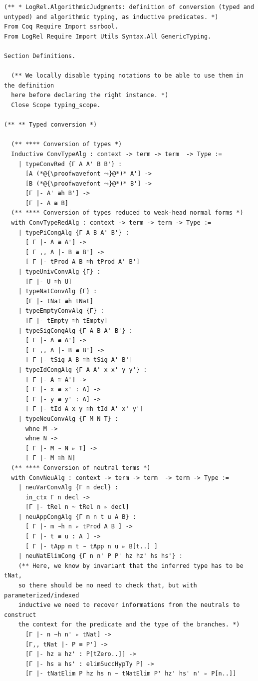 \documentclass[10pt,a4paper]{amsart}
\begin{document}
\begin{lstlisting}
(** * LogRel.AlgorithmicJudgments: definition of conversion (typed and untyped) and algorithmic typing, as inductive predicates. *)
From Coq Require Import ssrbool.
From LogRel Require Import Utils Syntax.All GenericTyping.

Section Definitions.

  (** We locally disable typing notations to be able to use them in the definition
  here before declaring the right instance. *)
  Close Scope typing_scope.

(** ** Typed conversion *)

  (** **** Conversion of types *)
  Inductive ConvTypeAlg : context -> term -> term  -> Type :=
    | typeConvRed {Γ A A' B B'} :
      [A (*@{\proofwavefont ⤳}@*)* A'] ->
      [B (*@{\proofwavefont ⤳}@*)* B'] ->
      [Γ |- A' ≅h B'] ->
      [Γ |- A ≅ B]
  (** **** Conversion of types reduced to weak-head normal forms *)
  with ConvTypeRedAlg : context -> term -> term -> Type :=
    | typePiCongAlg {Γ A B A' B'} :
      [ Γ |- A ≅ A'] ->
      [ Γ ,, A |- B ≅ B'] ->
      [ Γ |- tProd A B ≅h tProd A' B']
    | typeUnivConvAlg {Γ} :
      [Γ |- U ≅h U]
    | typeNatConvAlg {Γ} :
      [Γ |- tNat ≅h tNat]
    | typeEmptyConvAlg {Γ} :
      [Γ |- tEmpty ≅h tEmpty]
    | typeSigCongAlg {Γ A B A' B'} :
      [ Γ |- A ≅ A'] ->
      [ Γ ,, A |- B ≅ B'] ->
      [ Γ |- tSig A B ≅h tSig A' B']
    | typeIdCongAlg {Γ A A' x x' y y'} :
      [ Γ |- A ≅ A'] ->
      [ Γ |- x ≅ x' : A] ->
      [ Γ |- y ≅ y' : A] ->
      [ Γ |- tId A x y ≅h tId A' x' y']
    | typeNeuConvAlg {Γ M N T} :
      whne M ->
      whne N ->
      [ Γ |- M ~ N ▹ T] -> 
      [ Γ |- M ≅h N]
  (** **** Conversion of neutral terms *)
  with ConvNeuAlg : context -> term -> term  -> term -> Type :=
    | neuVarConvAlg {Γ n decl} :
      in_ctx Γ n decl ->
      [Γ |- tRel n ~ tRel n ▹ decl]
    | neuAppCongAlg {Γ m n t u A B} :
      [ Γ |- m ~h n ▹ tProd A B ] ->
      [ Γ |- t ≅ u : A ] ->
      [ Γ |- tApp m t ~ tApp n u ▹ B[t..] ]
    | neuNatElimCong {Γ n n' P P' hz hz' hs hs'} :
    (** Here, we know by invariant that the inferred type has to be tNat,
    so there should be no need to check that, but with parameterized/indexed
    inductive we need to recover informations from the neutrals to construct
    the context for the predicate and the type of the branches. *)
      [Γ |- n ~h n' ▹ tNat] ->
      [Γ,, tNat |- P ≅ P'] ->
      [Γ |- hz ≅ hz' : P[tZero..]] ->
      [Γ |- hs ≅ hs' : elimSuccHypTy P] ->
      [Γ |- tNatElim P hz hs n ~ tNatElim P' hz' hs' n' ▹ P[n..]]

\end{lstlisting}
\end{document}
